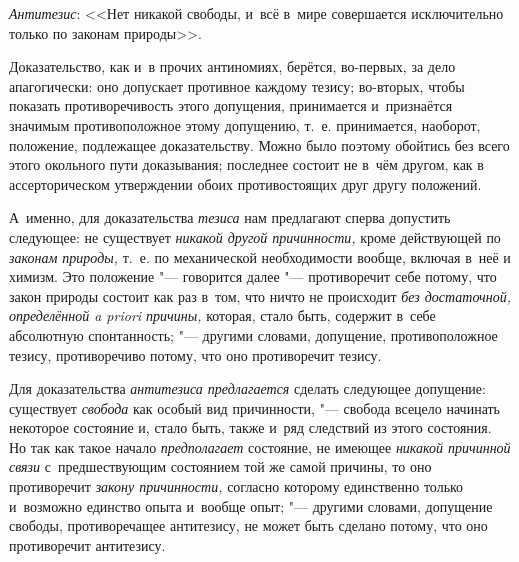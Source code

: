 {\em Антитезис}: <<Нет
никакой свободы, и~всё в~мире совершается исключительно только по законам
природы>>.

Доказательство, как и~в прочих антиномиях, берётся, во-первых,
за дело апагогически: оно допускает противное каждому тезису; во-вторых,
чтобы показать противоречивость этого допущения, принимается и~признаётся
значимым противоположное этому допущению, т.~е. принимается, наоборот,
положение, подлежащее доказательству. Можно было поэтому обойтись без всего
этого окольного пути доказывания; последнее состоит не в~чём другом, как в
ассерторическом утверждении обоих противостоящих друг другу положений.

А~именно, для доказательства
{\em тезиса} нам
предлагают сперва допустить следующее: не существует
{\em никакой другой причинности,}
кроме действующей по
{\em законам природы,}
т.~е. по механической необходимости вообще, включая в~неё и
химизм. Это положение "--- говорится далее
"--- противоречит себе потому, что закон природы состоит как раз
в~том, что ничто не происходит {\em без
достаточной, определённой a priori причины,} которая, стало
быть, содержит в~себе абсолютную спонтанность; "--- другими
словами, допущение, противоположное тезису, противоречиво потому, что оно
противоречит тезису.

Для доказательства
{\em антитезиса предлагается}
сделать следующее допущение: существует
{\em свобода} как особый
вид причинности, "--- свобода всецело начинать некоторое
состояние и, стало быть, также и~ряд следствий из этого состояния. Но так
как такое начало {\em предполагает}
состояние, не имеющее
{\em никакой причинной связи}
с~предшествующим состоянием той же самой причины, то оно
противоречит {\em закону причинности,}
согласно которому единственно только и~возможно единство
опыта и~вообще опыт; "--- другими словами, допущение свободы,
противоречащее антитезису, не может быть сделано потому, что оно
противоречит антитезису.

